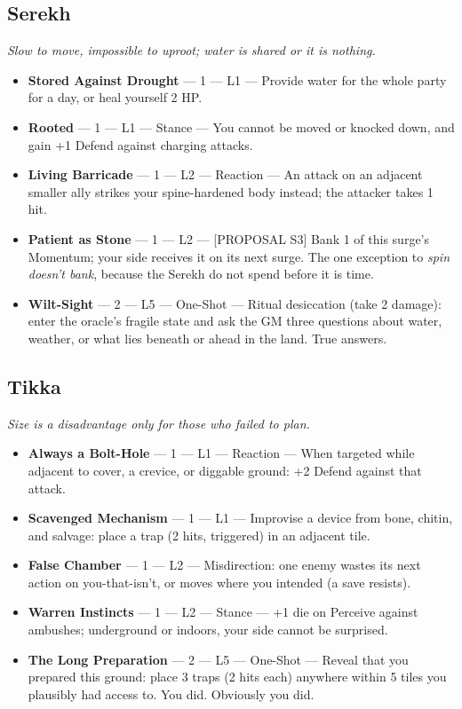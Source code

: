 \subsection{Serekh}
\textit{Slow to move, impossible to uproot; water is shared or it is nothing.}
\begin{itemize}
    \item \textbf{Stored Against Drought} --- 1 --- L1 --- Provide water for the whole party for a day, or heal yourself 2 HP.
    \item \textbf{Rooted} --- 1 --- L1 --- Stance --- You cannot be moved or knocked down, and gain +1 Defend against charging attacks.
    \item \textbf{Living Barricade} --- 1 --- L2 --- Reaction --- An attack on an adjacent smaller ally strikes your spine-hardened body instead; the attacker takes 1 hit.
    \item \textbf{Patient as Stone} --- 1 --- L2 --- [PROPOSAL S3] Bank 1 of this surge's Momentum; your side receives it on its next surge. The one exception to \textit{spin doesn't bank}, because the Serekh do not spend before it is time.
    \item \textbf{Wilt-Sight} --- 2 --- L5 --- One-Shot --- Ritual desiccation (take 2 damage): enter the oracle's fragile state and ask the GM three questions about water, weather, or what lies beneath or ahead in the land. True answers.
\end{itemize}

\subsection{Tikka}
\textit{Size is a disadvantage only for those who failed to plan.}
\begin{itemize}
    \item \textbf{Always a Bolt-Hole} --- 1 --- L1 --- Reaction --- When targeted while adjacent to cover, a crevice, or diggable ground: +2 Defend against that attack.
    \item \textbf{Scavenged Mechanism} --- 1 --- L1 --- Improvise a device from bone, chitin, and salvage: place a trap (2 hits, triggered) in an adjacent tile.
    \item \textbf{False Chamber} --- 1 --- L2 --- Misdirection: one enemy wastes its next action on you-that-isn't, or moves where you intended (a save resists).
    \item \textbf{Warren Instincts} --- 1 --- L2 --- Stance --- +1 die on Perceive against ambushes; underground or indoors, your side cannot be surprised.
    \item \textbf{The Long Preparation} --- 2 --- L5 --- One-Shot --- Reveal that you prepared this ground: place 3 traps (2 hits each) anywhere within 5 tiles you plausibly had access to. You did. Obviously you did.
\end{itemize}

